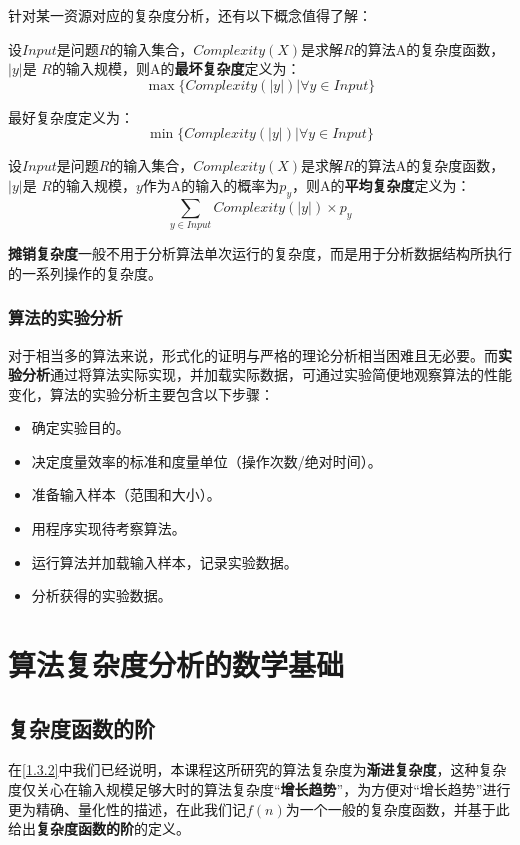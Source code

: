 \documentclass[12pt,a4paper,violet]{bbe}
\begin{document}
针对某一资源对应的复杂度分析，还有以下概念值得了解：
\begin{definition}
设$Input$是问题$R$的输入集合，$Complexity(X)$是求解$R$的算法A的复杂度函数，$|y|$是 $R$的输入规模，则A的\textbf{最坏复杂度}定义为：
$$
\max\{Complexity(|y|)|\forall y\in Input\}
$$

最好复杂度定义为：
$$
\min\{Complexity(|y|)|\forall y\in Input\}
$$
\end{definition}
\begin{definition}
	设$Input$是问题$R$的输入集合，$Complexity(X)$是求解$R$的算法A的复杂度函数，$|y|$是 $R$的输入规模，$y$作为A的输入的概率为$p_y$，则A的\textbf{平均复杂度}定义为：
	$$
	\sum\limits_{y\in Input}Complexity(|y|)\times p_y
	$$
\end{definition}
\begin{definition}
\textbf{摊销复杂度}一般不用于分析算法单次运行的复杂度，而是用于分析数据结构所执行的一系列操作的复杂度。
\end{definition}
\subsection{算法的实验分析}
对于相当多的算法来说，形式化的证明与严格的理论分析相当困难且无必要。而\textbf{实验分析}通过将算法实际实现，并加载实际数据，可通过实验简便地观察算法的性能变化，算法的实验分析主要包含以下步骤：
\begin{itemize}
	\item 确定实验目的。
	\item 决定度量效率的标准和度量单位（操作次数/绝对时间）。
	\item 准备输入样本（范围和大小）。
	\item 用程序实现待考察算法。
	\item 运行算法并加载输入样本，记录实验数据。
	\item 分析获得的实验数据。
\end{itemize}

\chapter{算法复杂度分析的数学基础}
\section{复杂度函数的阶\label{2.1}}
在\cref{1.3.2}中我们已经说明，本课程这所研究的算法复杂度为\textbf{渐进复杂度}，这种复杂度仅关心在输入规模足够大时的算法复杂度“\textbf{增长趋势}”，为方便对“增长趋势”进行更为精确、量化性的描述，在此我们记$f(n)$为一个一般的复杂度函数，并基于此给出\textbf{复杂度函数的阶}的定义。
\end{document}
